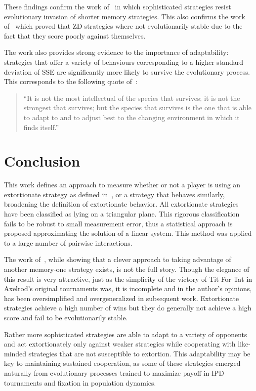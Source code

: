 \documentclass[a4paper]{article}
\newcommand{\SSe}{\text{SSE}}
\begin{document}
These findings confirm the work of~\cite{Moran1707} in which sophisticated
strategies resist evolutionary invasion of shorter memory strategies. This also
confirms the work of~\cite{adami2013evolutionary, hilbe2015partners} which
proved that ZD strategies where not evolutionarily stable due to the fact that
they score poorly against themselves.

The work also provides strong evidence to the importance of adaptability:
strategies that offer a variety of behaviours corresponding to a higher standard
deviation of \(\SSe\) are significantly more likely to survive the
evolutionary process. This corresponds to the following quote
of~\cite{darwin1869origin}:

\begin{quote}
``It is not the most intellectual of the species that survives; it is not the
strongest that survives; but the species that survives is the one that is able
to adapt to and to adjust best to the changing environment in which it finds
itself.''
\end{quote}

\section{Conclusion}\label{sec:conclusion}

This work defines an approach to measure whether or not a player is using an
extortionate strategy as defined in~\cite{Press2012}, or a strategy that behaves
similarly, broadening the definition of extortionate behavior. All extortionate
strategies have been classified as lying on a triangular plane.  This rigorous
classification fails to be robust to small measurement error, thus a statistical
approach is proposed approximating the solution of a linear system. This method
was applied to a large number of pairwise interactions.

The work of~\cite{Press2012}, while showing that a clever approach to taking
advantage of another memory-one strategy exists, is not the full story.
Though the elegance of this result is very attractive, just as the simplicity of
the victory of Tit For Tat in Axelrod's original tournaments was, it is
incomplete and in the author's opinions, has been oversimplified and
overgeneralized in subsequent work. Extortionate strategies achieve a high
number of wins but they do generally not achieve a high score and fail to be
evolutionarily stable.

Rather more sophisticated strategies are able to adapt to a variety of opponents
and act extortionately only against weaker strategies while cooperating with
like-minded strategies that are not susceptible to extortion. This adaptability
may be key to maintaining sustained cooperation, as some of these strategies
emerged naturally from evolutionary processes trained to maximize payoff in
IPD tournaments and fixation in population dynamics.
\end{document}
